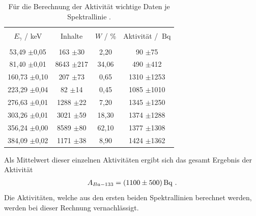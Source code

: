 \begin{table}
\centering
\caption{Für die Berechnung der Aktivität wichtige Daten je Spektrallinie \cite{sample}.}
\begin{tabular}{c c c c}
\hline \\
$E_{\gamma}$ / keV & Inhalte & $W$ / \%& Aktivität / $\SI{}{\becquerel}$\\
\hline \\
53,49 $\pm$0,05  &  163  $\pm$30 &  2,20  &  90  $\pm$75 \\ 81,40 $\pm$0,01  &  8643  $\pm$217 &  34,06  &  490  $\pm$412 \\ 160,73 $\pm$0,10  &  207  $\pm$73 &  0,65  &  1310  $\pm$1253 \\ 223,29 $\pm$0,04  &  82  $\pm$14 &  0,45  &  1085  $\pm$1010 \\ 276,63 $\pm$0,01  &  1288  $\pm$22 &  7,20  &  1345  $\pm$1250 \\ 303,26 $\pm$0,01  &  3021  $\pm$59 &  18,30  &  1374  $\pm$1288 \\ 356,24 $\pm$0,00  &  8589  $\pm$80 &  62,10  &  1377  $\pm$1308 \\ 384,09 $\pm$0,02  &  1171  $\pm$38 &  8,90  &  1424  $\pm$1362 \\
\hline
\end{tabular}
\label{tab:a_d_1}
\end{table}
Als Mittelwert dieser einzelnen Aktivitäten ergibt sich das gesamt Ergebnis der Aktivität
\begin{align*}
A_{Ba-133}=\SI{1100+-500}{\becquerel} \text{ .}
\end{align*}
Die Aktivitäten, welche aus den ersten beiden Spektrallinien berechnet werden, werden bei dieser Rechnung vernachlässigt.

\FloatBarrier
